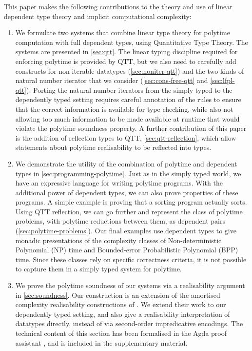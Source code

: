 \documentclass[acmsmall,screen]{acmart}
\begin{document}
This paper makes the following contributions to the theory and use of
linear dependent type theory and implicit computational complexity:
\begin{enumerate}
\item We formulate two systems that combine linear type theory for
  polytime computation with full dependent types, using Quantitative
  Type Theory. The systems are presented in \autoref{sec:qtt}. The
  linear typing discipline required for enforcing polytime is provided
  by QTT, but we also need to carefully add constructs for
  non-iterable datatypes (\autoref{sec:noniter-qtt}) and the two kinds
  of natural number iterator that we consider
  (\autoref{sec:cons-free-qtt} and \autoref{sec:lfpl-qtt}). Porting
  the natural number iterators from the simply typed to the
  dependently typed setting requires careful annotation of the rules
  to ensure that the correct information is available for type
  checking, while also not allowing too much information to be made
  available at runtime that would violate the polytime soundness
  property. A further contribution of this paper is the addition of
  reflection types to QTT, \autoref{sec:qtt-reflection}, which allow
  statements about polytime realisability to be reflected into
  types.
\item We demonstrate the utility of the combination of polytime and
  dependent types in \autoref{sec:programming-polytime}. Just as in
  the simply typed world, we have an expressive language for writing
  polytime programs. With the additional power of dependent types, we
  can also prove properties of these programs. A simple example is
  proving that a sorting program actually sorts. Using QTT reflection,
  we can go further and represent the class of polytime problems, with
  polytime reductions between them, as dependent pairs
  (\autoref{sec:polytime-problems}). Our final examples use dependent
  types to give monadic presentations of the complexity classes of
  Non-deterministic Polynomial (NP) time and Bounded-error
  Probabilistic Polynomial (BPP) time. Since these classes rely on
  specific correctness criteria, it is not possible to capture them in
  a simply typed system for polytime.
\item We prove the polytime soundness of our systems via a
  realisability argument in \autoref{sec:soundness}. Our construction
  is an extension of the amortised complexity realisability
  constructions of \citet{dallago11realisability}. We extend their
  work to our dependently typed setting, and also give a realisability
  interpretation of datatypes directly, instead of via second-order
  impredicative encodings. The technical content of this section has
  been formalised in the Agda proof assistant
  \cite{norell2008dependently}, and is included in the supplementary
  material.
\end{enumerate}
\end{document}
